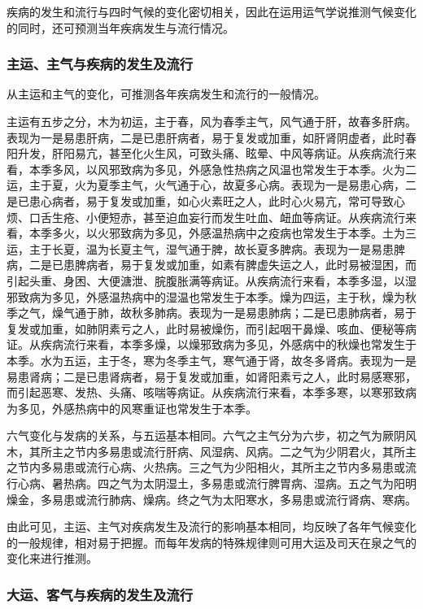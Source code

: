\documentclass[12pt]{ctexbook}
\begin{document}
疾病的发生和流行与四时气候的变化密切相关，因此在运用运气学说推测气候变化的同时，还可预测当年疾病发生与流行情况。

\subsubsection{主运、主气与疾病的发生及流行}%

从主运和主气的变化，可推测各年疾病发生和流行的一般情况。

主运有五步之分，木为初运，主于春，风为春季主气，风气通于肝，故春多肝病。表现为一是易患肝病，二是已患肝病者，易于复发或加重，如肝肾阴虚者，此时春阳升发，肝阳易亢，甚至化火生风，可致头痛、眩晕、中风等病证。从疾病流行来看，本季多风，以风邪致病为多见，外感急性热病之风温也常发生于本季。火为二运，主于夏，火为夏季主气，火气通于心，故夏多心病。表现为一是易患心病，二是已患心病者，易于复发或加重，如心火素旺之人，此时心火易亢，常可导致心烦、口舌生疮、小便短赤，甚至迫血妄行而发生吐血、衄血等病证。从疾病流行来看，本季多火，以火邪致病为多见，外感温热病中之疫病也常发生于本季。土为三运，主于长夏，温为长夏主气，湿气通于脾，故长夏多脾病。表现为一是易患脾病，二是已患脾病者，易于复发或加重，如素有脾虚失运之人，此时易被湿困，而引起头重、身困、大便溏泄、脘腹胀满等病证。从疾病流行来看，本季多湿，以湿邪致病为多见，外感温热病中的湿温也常发生于本季。燥为四运，主于秋，燥为秋季之气，燥气通于肺，故秋多肺病。表现为一是易患肺病；二是已患肺病者，易于复发或加重，如肺阴素亏之人，此时易被燥伤，而引起咽干鼻燥、咳血、便秘等病证。从疾病流行来看，本季多燥，以燥邪致病为多见，外感病中的秋燥也常发生于本季。水为五运，主于冬，寒为冬季主气，寒气通于肾，故冬多肾病。表现为一是易患肾病；二是已患肾病者，易于复发或加重，如肾阳素亏之人，此时易感寒邪，而引起恶寒、发热、头痛、咳喘等病证。从疾病流行来看，本季多寒，以寒邪致病为多见，外感热病中的风寒重证也常发生于本季。

六气变化与发病的关系，与五运基本相同。六气之主气分为六步，初之气为厥阴风木，其所主之节内多易患或流行肝病、风湿病、风病。二之气为少阴君火，其所主之节内多易患或流行心病、火热病。三之气为少阳相火，其所主之节内多易患或流行心病、暑热病。四之气为太阴湿土，多易患或流行脾胃病、湿病。五之气为阳明燥金，多易患或流行肺病、燥病。终之气为太阳寒水，多易患或流行肾病、寒病。

由此可见，主运、主气对疾病发生及流行的影响基本相同，均反映了各年气候变化的一般规律，相对易于把握。而每年发病的特殊规律则可用大运及司天在泉之气的变化来进行推测。

\subsubsection{大运、客气与疾病的发生及流行}%
\end{document}
